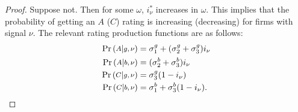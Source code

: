 \documentclass[notitlepage]{article}
\begin{document}
\begin{proof}
Suppose not. Then for some $\omega$, $i^{*}_{\nu}$ increases in $\omega$. This implies that the probability of getting an $A$ ($C$) rating is increasing (decreasing) for firms with signal $\nu$. The relevant rating production functions are as follows:
\begin{align*}
\textup{Pr}\left ( \medmath{A} | \medmath{g,\nu} \right) &= \sigma^{g}_{1} + (\sigma^{g}_{2}+\sigma^{g}_{3})i_{\nu}\\
\textup{Pr}\left ( \medmath{A} | \medmath{b,\nu} \right) &= (\sigma^{b}_{2}+\sigma^{b}_{3})i_{\nu}\\
\textup{Pr}\left ( \medmath{C} | \medmath{g,\nu} \right) &= \sigma^{g}_{3}(1-i_{\nu})\\
\textup{Pr}\left ( \medmath{C} | \medmath{b,\nu} \right) &= \sigma^{b}_{1} +  \sigma^{b}_{3}(1-i_{\nu}).
\end{align*}


\end{proof}
\end{document}
